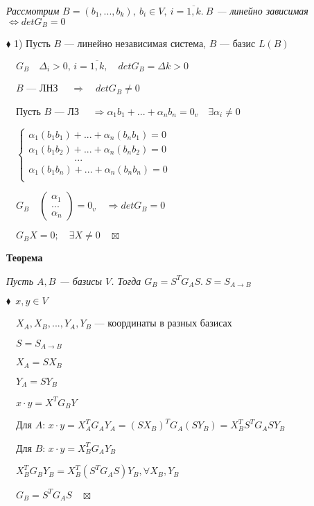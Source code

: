 \documentclass[a4paper, 12pt]{report}
\begin{document}
	\textit{Рассмотрим} $B=(b_1,...,b_k),\ b_i \in V,\ i=\overline{1,k}.\ B$\textit{ --- линейно зависимая} $\Longleftrightarrow det G_B=0$
	\par \bigskip
	$\blacklozenge $ 1) Пусть 
	$B$ --- линейно независимая система, $ B$ --- базис $L(B)$
	
	$\quad G_B \quad \Delta_i >0, \, i=\overline{1,k}, \quad det G_B =\Delta k >0$
	
	$\quad B$ --- ЛНЗ $\quad \Rightarrow \quad det G_B \ne 0$
	
	$\quad$Пусть $B$ --- ЛЗ $\quad \Rightarrow \alpha_1 b_1+...+\alpha_n b_n =0_v \quad \exists \alpha_i \ne 0$
	
	$\quad\begin{cases}
		\alpha_1(b_1b_1)+...+\alpha_n(b_n b_1)=0\\
		\alpha_1(b_1b_2)+...+\alpha_n(b_n b_2)=0\\
		\qquad\qquad\;\;\, ...\\
		\alpha_1(b_1 b_n)+...+\alpha_n(b_n b_n)=0\\
	\end{cases}$
	
	$\quad G_B \quad \begin{pmatrix}
		\alpha_1\\
		...\\
		\alpha_n
	\end{pmatrix} = 0_v \quad \Rightarrow det G_B=0$
	
	$\quad G_B X=0; \quad \exists X \ne 0\quad\boxtimes$
	\par \bigskip
	\textbf{Теорема}
	
	\textit{Пусть $ A, B$ --- базисы $V$. Тогда $G_B=S^T G_A S.\ S=S_{A \rightarrow B}$}
	\par \bigskip
	$\blacklozenge\;\ x,y \in V$
	
	$\quad X_A,X_B,...,Y_A,Y_B$ --- координаты в разных базисах
	
	$\quad S=S_{A \rightarrow B}$
	
	$\quad X_A=S X_B$
	
	$\quad Y_A=S Y_B$
	
	$\quad x \cdot y=X^T G_B Y$
	
	$\quad$Для $A$: $x \cdot y=X_A^T G_A Y_A=(S X_B)^T G_A (S Y_B)=X_B^T S^T G_A S Y_B$
	
	$\quad$Для $B$: $x \cdot y=X_B^T G_A Y_B$
	
	$\quad X_B^T G_B Y_B=X_B^T(S^T G_A S) Y_B, \forall X_B, Y_B$
	
	$\quad G_B=S^T G_A S \quad \boxtimes $
	
\end{document}

